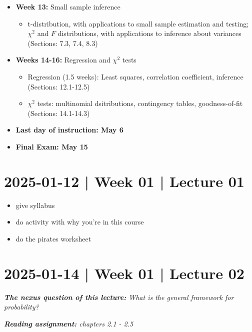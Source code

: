 \documentclass[10pt]{article}
\theoremstyle{definition}
\newcommand{\1}[1]{\textbf{1}_{\left[#1\right]}} %
\begin{document}
\begin{itemize}
  \begin{itemize}
    \item Estimation (1.5 weeks): Types and comparison of estimators; sampling distributions
    for means/proportions, and their use in large sample estimation; sample size. (Sections 7.1,
    7.2)
    \item Hypothesis testing (1.5 weeks): Components of a test; signficance and power; p-values;
    large-sample tests for means and proportions (Sections: 8.1-8.4)
  \end{itemize}
  \item \textbf{Week 13:} Small sample inference
  \begin{itemize}
    \item t-distribution, with applications to small sample estimation and testing; $\chi^{2}$ and $F$
    distributions, with applications to inference about variances (Sections: 7.3, 7.4, 8.3)
  \end{itemize}
  \item \textbf{Weeks 14-16:} Regression and $\chi^{2}$ tests
  \begin{itemize}
    \item Regression (1.5 weeks): Least squares, correlation coefficient, inference (Sections:
    12.1-12.5)
    \item $\chi^{2}$ tests: multinomial dsitributions, contingency tables, goodness-of-fit (Sections: 14.1-14.3)
  \end{itemize}
  \item \textbf{Last day of instruction: May 6}
  \item \textbf{Final Exam: May 15}
\end{itemize} 

\newpage
\section{2025-01-12 | Week 01 |  Lecture 01}
\begin{itemize}
  \item give syllabus
  \item do activity with why you're in this course
  \item do the pirates worksheet
\end{itemize}

\newpage
\section{2025-01-14  | Week 01 | Lecture 02}
\begin{center}
  \begin{tcolorbox}[width=0.9\textwidth, colback=white, colframe=black]
    \textit{\textbf{The nexus question of this lecture:} What is the general
      framework for probability?}

    \textit{\textbf{Reading assignment:} chapters 2.1 - 2.5}
  \end{tcolorbox}
\end{center}
\end{document}
